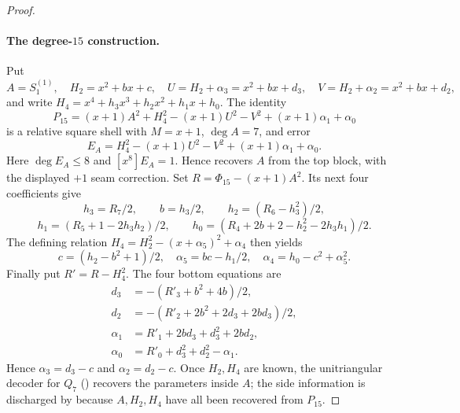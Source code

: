 \begin{proof}
    \paragraph{The degree-$15$ construction.}
    Put
    \[
      A=S^{(1)}_1,\quad H_2=x^2+bx+c,\quad
      U=H_2+\alpha _3=x^2+bx+d_3,\quad
      V=H_2+\alpha _2=x^2+bx+d_2,
    \]
    and write $H_4=x^4+h_3x^3+h_2x^2+h_1x+h_0$.  The identity
    \[
      P_{15}=(x+1)A^2+H_4^2-(x+1)U^2-V^2+(x+1)\alpha _1+\alpha _0
    \]
    is a relative square shell with $M=x+1$, $\deg A=7$, and error
    \[
      E_A=H_4^2-(x+1)U^2-V^2+(x+1)\alpha_1+\alpha_0.
    \]
    Here $\deg E_A\le8$ and $[x^8]E_A=1$.  Hence
     recovers $A$ from the top block, with
    the displayed $+1$ seam correction.  Set
    $R=\Phi_{15}-(x+1)A^2$.  Its next four
    coefficients give
    \[
      h_3=R_7/2,\qquad b=h_3/2,\qquad
      h_2=(R_6-h_3^2)/2,
    \]
    \[
      h_1=(R_5+1-2h_3h_2)/2,\qquad
      h_0=(R_4+2b+2-h_2^2-2h_3h_1)/2.
    \]
    The defining relation $H_4=H_2^2-(x+\alpha _5)^2+\alpha _4$
    then yields
    \[
      c=(h_2-b^2+1)/2,\quad
      \alpha _5=bc-h_1/2,\quad \alpha _4=h_0-c^2+\alpha _5^2.
    \]
    Finally put $R'=R-H_4^2$.  The four bottom equations are
    \[
      \begin{aligned}
      d_3&=-(R'_3+b^2+4b)/2,\\
      d_2&=-(R'_2+2b^2+2d_3+2bd_3)/2,\\
      \alpha _1&=R'_1+2bd_3+d_3^2+2bd_2,\\
      \alpha _0&=R'_0+d_3^2+d_2^2-\alpha _1.
      \end{aligned}
    \]
    Hence $\alpha _3=d_3-c$ and $\alpha _2=d_2-c$.  Once $H_2,H_4$
    are known, the unitriangular decoder for $Q_7$ ()
    recovers the parameters inside $A$; the side information is discharged
    by  because $A,H_2,H_4$ have all
    been recovered from $P_{15}$.


\end{proof}
